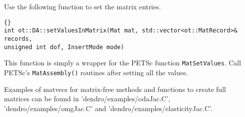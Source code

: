 \documentclass[10pt,reqno,a4paper]{report}
\numberwithin{equation}{section}
\begin{document}
Use the following function to set the matrix entries.

\begin{lstlisting}[frame=trbl, fontadjust]{}
int ot::DA::setValuesInMatrix(Mat mat, std::vector<ot::MatRecord>& records, 
unsigned int dof, InsertMode mode)
\end{lstlisting}

This function is simply a wrapper for the PETSc function \lstinline[basicstyle=\bfseries]!MatSetValues!. Call PETSc's \lstinline[basicstyle=\bfseries]!MatAssembly()! routines after setting all the values. 

Examples of matvecs for matrix-free methods and functions to create full matrices can be found in 'dendro/examples/odaJac.C', 'dendro/examples/omgJac.C' and 'dendro/examples/elasticityJac.C'. 
\end{document}
